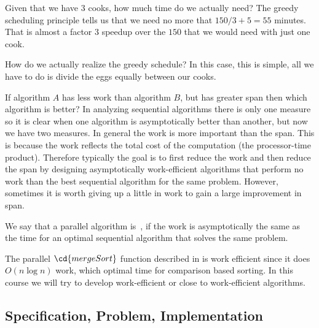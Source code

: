 \begin{grp}
\begin{example}
Given that we have $3$ cooks, how much time do we actually need?
%
The greedy scheduling principle tells us that we need no more that
$150/3 + 5 = 55$ minutes. That is almost a factor $3$ speedup over the
$150$ that we would need with just one cook. 
%

How do we actually realize the greedy schedule?  In this case, this is
simple, all we have to do is divide the eggs equally between our
cooks.

\end{example}
\end{grp}

\begin{gram}
If algorithm $A$ has less work than algorithm $B$, but has greater
span then which algorithm is better?  In analyzing sequential
algorithms there is only one measure so it is clear when one algorithm
is asymptotically better than another, but now we have two measures.
In general the work is more important than the span.  
%
This is because the work reflects the total cost of the computation
(the processor-time product).  Therefore typically the goal is to
first reduce the work and then reduce the span by designing
asymptotically work-efficient algorithms that perform no work
than the best sequential algorithm for the same problem. 
%
However, sometimes it is worth giving up a little in work to gain a
large improvement in span.
%
\end{gram}

\begin{grp}
\begin{definition}
\label{def:intro::work-efficiency}
We say that a parallel algorithm is~, if the work is asymptotically the same as the time for
an optimal sequential algorithm that solves the same problem.
\end{definition} 

\begin{example}
The parallel $\cd{mergeSort}$ function described in
 is work efficient since it does $O(n \log n)$
work, which optimal time for comparison based sorting.  In this course
we will try to develop work-efficient or close to work-efficient
algorithms.
\end{example}
\end{grp}

\subsection{Specification, Problem, Implementation}

